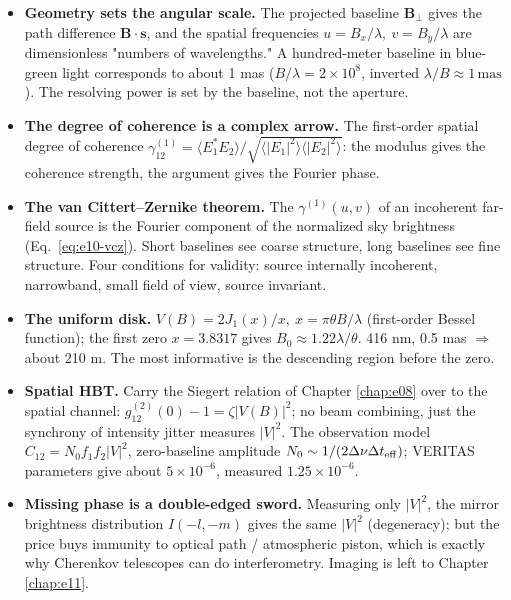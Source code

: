 \begin{itemize}
  \item \textbf{Geometry sets the angular scale.} The projected baseline \(\bm B_\perp\) gives the path difference \(\bm B\cdot\bm s\), and the spatial frequencies \(u=B_x/\lambda,\ v=B_y/\lambda\) are dimensionless "numbers of wavelengths." A hundred-meter baseline in blue-green light corresponds to about 1 mas (\(B/\lambda=2\times10^8\), inverted \(\lambda/B\approx1\,\mathrm{mas}\)). The resolving power is set by the baseline, not the aperture.
  \item \textbf{The degree of coherence is a complex arrow.} The first-order spatial degree of coherence \(\gamma_{12}^{(1)}=\langle E_1^\ast E_2\rangle/\sqrt{\langle|E_1|^2\rangle\langle|E_2|^2\rangle}\): the modulus gives the coherence strength, the argument gives the Fourier phase.
  \item \textbf{The van Cittert--Zernike theorem.} The \(\gamma^{(1)}(u,v)\) of an incoherent far-field source is the Fourier component of the normalized sky brightness (Eq.~\eqref{eq:e10-vcz}). Short baselines see coarse structure, long baselines see fine structure. Four conditions for validity: source internally incoherent, narrowband, small field of view, source invariant.
  \item \textbf{The uniform disk.} \(V(B)=2J_1(x)/x,\ x=\pi\theta B/\lambda\) (first-order Bessel function); the first zero \(x=3.8317\) gives \(B_0\approx1.22\lambda/\theta\). 416 nm, 0.5 mas \(\Rightarrow\) about 210 m. The most informative is the descending region before the zero.
  \item \textbf{Spatial HBT.} Carry the Siegert relation of Chapter \ref{chap:e08} over to the spatial channel: \(g_{12}^{(2)}(0)-1=\zeta|V(B)|^2\); no beam combining, just the synchrony of intensity jitter measures \(|V|^2\). The observation model \(C_{12}=N_0 f_1 f_2|V|^2\), zero-baseline amplitude \(N_0\sim1/(2\Delta\nu\Delta t_{\rm eff})\); VERITAS parameters give about \(5\times10^{-6}\), measured \(1.25\times10^{-6}\).
  \item \textbf{Missing phase is a double-edged sword.} Measuring only \(|V|^2\), the mirror brightness distribution \(I(-l,-m)\) gives the same \(|V|^2\) (degeneracy); but the price buys immunity to optical path / atmospheric piston, which is exactly why Cherenkov telescopes can do interferometry. Imaging is left to Chapter \ref{chap:e11}.
\end{itemize}

